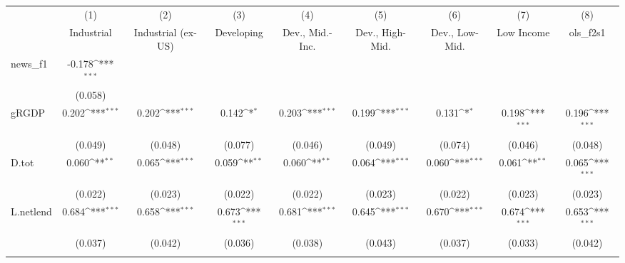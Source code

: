 {
\def\sym#1{\ifmmode^{#1}\else\(^{#1}\)\fi}
\begin{tabular}{l*{8}{c}}
\toprule
            &\multicolumn{1}{c}{(1)}&\multicolumn{1}{c}{(2)}&\multicolumn{1}{c}{(3)}&\multicolumn{1}{c}{(4)}&\multicolumn{1}{c}{(5)}&\multicolumn{1}{c}{(6)}&\multicolumn{1}{c}{(7)}&\multicolumn{1}{c}{(8)}\\
            &\multicolumn{1}{c}{Industrial}&\multicolumn{1}{c}{Industrial (ex-US)}&\multicolumn{1}{c}{Developing}&\multicolumn{1}{c}{Dev., Mid.-Inc.}&\multicolumn{1}{c}{Dev., High-Mid.}&\multicolumn{1}{c}{Dev., Low-Mid.}&\multicolumn{1}{c}{Low Income}&\multicolumn{1}{c}{ols\_f2s1}\\
\midrule
news\_f1     &      -0.178\sym{***}&                     &                     &                     &                     &                     &                     &                     \\
            &     (0.058)         &                     &                     &                     &                     &                     &                     &                     \\
\addlinespace
gRGDP       &       0.202\sym{***}&       0.202\sym{***}&       0.142\sym{*}  &       0.203\sym{***}&       0.199\sym{***}&       0.131\sym{*}  &       0.198\sym{***}&       0.196\sym{***}\\
            &     (0.049)         &     (0.048)         &     (0.077)         &     (0.046)         &     (0.049)         &     (0.074)         &     (0.046)         &     (0.048)         \\
\addlinespace
D.tot       &       0.060\sym{**} &       0.065\sym{***}&       0.059\sym{**} &       0.060\sym{**} &       0.064\sym{***}&       0.060\sym{***}&       0.061\sym{**} &       0.065\sym{***}\\
            &     (0.022)         &     (0.023)         &     (0.022)         &     (0.022)         &     (0.023)         &     (0.022)         &     (0.023)         &     (0.023)         \\
\addlinespace
L.netlend   &       0.684\sym{***}&       0.658\sym{***}&       0.673\sym{***}&       0.681\sym{***}&       0.645\sym{***}&       0.670\sym{***}&       0.674\sym{***}&       0.653\sym{***}\\
            &     (0.037)         &     (0.042)         &     (0.036)         &     (0.038)         &     (0.043)         &     (0.037)         &     (0.033)         &     (0.042)         \\
\addlinespace

\end{tabular}}

